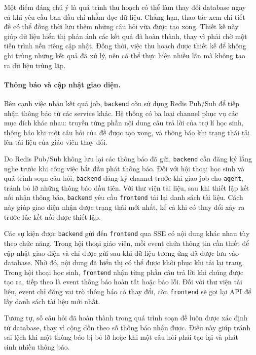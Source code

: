 Một điểm đáng chú ý là quá trình thu hoạch có thể làm thay đổi database ngay cả khi yêu cầu 
ban đầu chỉ nhằm đọc dữ liệu. Chẳng hạn, thao tác xem chi tiết đề có thể đồng thời lưu thêm 
những câu hỏi vừa được tạo xong. Thiết kế này giúp dữ liệu hiển thị phản ánh các kết quả đã 
hoàn thành, thay vì phải chờ một tiến trình nền riêng cập nhật. Đồng thời, việc thu hoạch 
được thiết kế để không ghi trùng những kết quả đã xử lý, nên có thể thực hiện nhiều lần mà 
không tạo ra dữ liệu trùng lặp.

\paragraph{Thông báo và cập nhật giao diện.}
Bên cạnh việc nhận kết quả job, \texttt{backend} còn sử dụng Redis Pub/Sub để tiếp nhận 
thông báo từ các service khác. Hệ thống có ba loại channel phục vụ các mục đích khác nhau: 
truyền từng phần nội dung câu trả lời của trợ lí học sinh, thông báo khi một câu hỏi của 
đề được tạo xong, và thông báo khi trạng thái tải lên tài liệu của giáo viên thay đổi.

Do Redis Pub/Sub không lưu lại các thông báo đã gửi, \texttt{backend} cần đăng ký lắng 
nghe trước khi công việc bắt đầu phát thông báo. Đối với hội thoại học sinh và quá 
trình soạn câu hỏi, \texttt{backend} đăng ký channel trước khi giao job cho \texttt{agent}, 
tránh bỏ lỡ những thông báo đầu tiên. Với thư viện tài liệu, sau khi thiết lập kết nối 
nhận thông báo, \texttt{backend} yêu cầu \texttt{frontend} tải lại danh sách tài liệu. 
Cách này giúp giao diện nhận được trạng thái mới nhất, kể cả khi có thay đổi xảy ra trước 
lúc kết nối được thiết lập.

Các sự kiện được \texttt{backend} gửi đến \texttt{frontend} qua SSE có nội dung khác 
nhau tùy theo chức năng. Trong hội thoại giáo viên, mỗi event chứa thông tin cần thiết 
để cập nhật giao diện và chỉ được gửi sau khi dữ liệu tương ứng đã được lưu vào database. 
Nhờ đó, nội dung đã hiển thị có thể được khôi phục khi tải lại trang. Trong hội thoại 
học sinh, \texttt{frontend} nhận từng phần câu trả lời khi chúng được tạo ra, tiếp theo 
là event thông báo hoàn tất hoặc báo lỗi. Đối với thư viện tài liệu, event chỉ đóng vai 
trò thông báo có thay đổi, còn \texttt{frontend} sẽ gọi lại API để lấy danh sách tài liệu mới nhất.

Tương tự, số câu hỏi đã hoàn thành trong quá trình soạn đề luôn được xác định từ 
database, thay vì cộng dồn theo số thông báo nhận được. Điều này giúp tránh sai lệch 
khi một thông báo bị bỏ lỡ hoặc khi một câu hỏi phải tạo lại và phát sinh nhiều thông báo.

